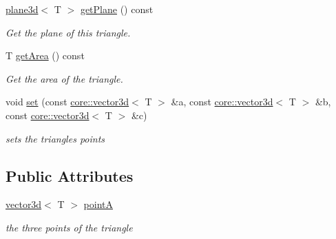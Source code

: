 \begin{DoxyCompactItemize}
\hyperlink{classirr_1_1core_1_1plane3d}{plane3d}$<$ T $>$ \hyperlink{classirr_1_1core_1_1triangle3d_a7b5460728cb47e5b2abb6d0e64b74577}{get\+Plane} () const
\begin{DoxyCompactList}\small\item\em Get the plane of this triangle. \end{DoxyCompactList}\item 
\mbox{\label{classirr_1_1core_1_1triangle3d_af8fd529a8e73b395c72507d76bf4f02d}} 
T \hyperlink{classirr_1_1core_1_1triangle3d_af8fd529a8e73b395c72507d76bf4f02d}{get\+Area} () const
\begin{DoxyCompactList}\small\item\em Get the area of the triangle. \end{DoxyCompactList}\item 
\mbox{\label{classirr_1_1core_1_1triangle3d_aebcd3f29fcbf9008dac95810c81f152c}} 
void \hyperlink{classirr_1_1core_1_1triangle3d_aebcd3f29fcbf9008dac95810c81f152c}{set} (const \hyperlink{classirr_1_1core_1_1vector3d}{core\+::vector3d}$<$ T $>$ \&a, const \hyperlink{classirr_1_1core_1_1vector3d}{core\+::vector3d}$<$ T $>$ \&b, const \hyperlink{classirr_1_1core_1_1vector3d}{core\+::vector3d}$<$ T $>$ \&c)
\begin{DoxyCompactList}\small\item\em sets the triangle\textquotesingle{}s points \end{DoxyCompactList}\end{DoxyCompactItemize}
\subsection*{Public Attributes}
\begin{DoxyCompactItemize}
\item 
\mbox{\label{classirr_1_1core_1_1triangle3d_ad4113299162b5855bccf8465b31ff78b}} 
\hyperlink{classirr_1_1core_1_1vector3d}{vector3d}$<$ T $>$ \hyperlink{classirr_1_1core_1_1triangle3d_ad4113299162b5855bccf8465b31ff78b}{pointA}
\begin{DoxyCompactList}\small\item\em the three points of the triangle \end{DoxyCompactList}\end{DoxyCompactItemize}


